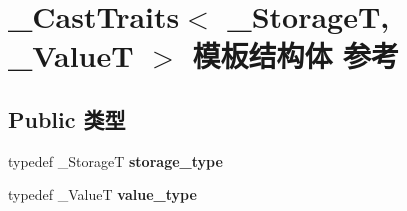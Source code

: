 \hypertarget{struct___cast_traits}{}\section{\+\_\+\+Cast\+Traits$<$ \+\_\+\+StorageT, \+\_\+\+ValueT $>$ 模板结构体 参考}
\label{struct___cast_traits}
\subsection*{Public 类型}
\begin{DoxyCompactItemize}
\item 
\mbox{\label{struct___cast_traits_a020b0c03e13aba9c33d72668002078db}} 
typedef \+\_\+\+StorageT {\bfseries storage\+\_\+type}
\item 
\mbox{\label{struct___cast_traits_a66fd2553ac0a81f012f0be805c8f4634}} 
typedef \+\_\+\+ValueT {\bfseries value\+\_\+type}
\end{DoxyCompactItemize}
